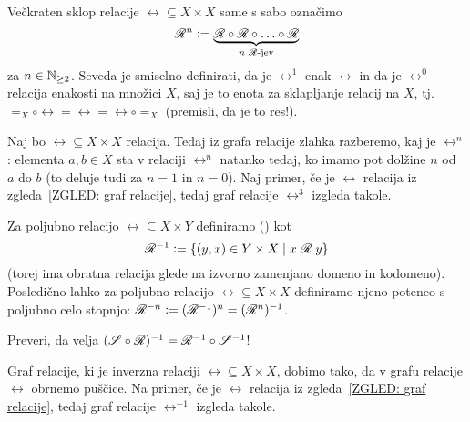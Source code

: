 		Večkraten sklop relacije $\rel \subseteq X \times X$ same s sabo označimo
		\[\rel^n \dfeq \underbrace{\rel \circ \rel \circ \ldots \circ \rel}_{\text{$n$ $\rel$-jev}}\]
		za $n \in \mathbb{N}_{\geq 2}$. Seveda je smiselno definirati, da je $\rel^1$ enak $\rel$ in da je $\rel^0$ relacija enakosti na množici $X$, saj je to enota za sklapljanje relacij na $X$, tj.~$=_X \circ \rel = \rel = \rel \circ =_X$ (premisli, da je to res!).
		
		\begin{zgled}
			Naj bo $\rel \subseteq X \times X$ relacija. Tedaj iz grafa relacije zlahka razberemo, kaj je $\rel^n$: elementa $a, b \in X$ sta v relaciji $\rel^n$ natanko tedaj, ko imamo pot dolžine $n$ od $a$ do $b$ (to deluje tudi za $n = 1$ in $n = 0$). Naj primer, če je $\rel$ relacija iz zgleda~\ref{ZGLED: graf relacije}, tedaj graf relacije $\rel^3$ izgleda takole.
			
		\end{zgled}
		
		Za poljubno relacijo $\rel \subseteq X \times Y$ definiramo  () \df{relacijo} kot
		\[\rel^{-1} \dfeq \set{(y, x) \in Y \times X}{\rel[x][y]}\]
		(torej ima obratna relacija glede na izvorno zamenjano domeno in kodomeno). Posledično lahko za poljubno relacijo $\rel \subseteq X \times X$ definiramo njeno potenco s poljubno celo stopnjo: $\rel^{-n} \dfeq (\rel^{-1})^n = (\rel^n)^{-1}$.
		
		\begin{vaja}
			Preveri, da velja $(\srel \circ \rel)^{-1} = \rel^{-1} \circ \srel^{-1}$!
		\end{vaja}
		
		\begin{zgled}
			Graf relacije, ki je inverzna relaciji $\rel \subseteq X \times X$, dobimo tako, da v grafu relacije $\rel$ obrnemo puščice. Na primer, če je $\rel$ relacija iz zgleda~\ref{ZGLED: graf relacije}, tedaj graf relacije $\rel^{-1}$ izgleda takole.
			
			\note{graf $\rel^{-1}$}
		\end{zgled}
		
